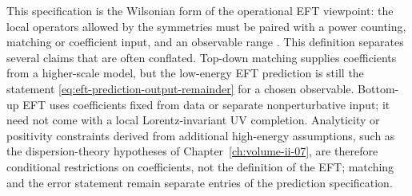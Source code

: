 This specification is the Wilsonian form of the operational EFT viewpoint: the
local operators allowed by the symmetries must be paired with a power
counting, matching or coefficient input, and an observable range
\cite{Weinberg1979PhenomenologicalLagrangians,Georgi1993EffectiveFieldTheory,
AdamsEtAl2006IRObstruction}.
This definition separates several claims that are often conflated.
Top-down matching supplies coefficients from a higher-scale model, but the
low-energy EFT prediction is still the statement
\eqref{eq:eft-prediction-output-remainder} for a chosen observable.  Bottom-up
EFT uses coefficients fixed from data or separate nonperturbative input; it
need not come with a local Lorentz-invariant UV completion.  Analyticity or
positivity constraints derived from additional high-energy assumptions, such
as the dispersion-theory hypotheses of Chapter~\ref{ch:volume-ii-07}, are
therefore conditional restrictions on coefficients, not the definition of the
EFT; matching and the error statement remain separate entries of the
prediction specification.

